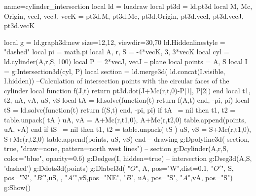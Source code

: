 \documentclass[border=5pt]{standalone}%
\begin{document}
\begin{luadraw}{name=cylinder_intersection}
local ld = luadraw
local pt3d = ld.pt3d
local M, Mc, Origin, vecI, vecJ, vecK = pt3d.M, pt3d.Mc, pt3d.Origin, pt3d.vecI, pt3d.vecJ, pt3d.vecK

local g = ld.graph3d:new{ size={12,12}, viewdir={30,70} }
ld.Hiddenlinestyle = "dashed"
local pi = math.pi
local A, r, S = -4*vecK, 3, 3*vecK
local cyl = ld.cylinder(A,r,S, 100)
local P = {2*vecJ, vecJ} -- plane
local points = {A, S}
local I = g:Intersection3d(cyl, P)
local section = ld.merge3d( ld.concat(I.visible, I.hidden))
--Calculation of intersection points with the circular faces of the cylinder
local function f(J,t)
    return pt3d.dot(J+Mc(r,t,0)-P[1], P[2])
end
local t1, t2, uA, vA, uS, vS
local tA = ld.solve(function(t) return f(A,t) end, -pi, pi)
local tS = ld.solve(function(t) return f(S,t) end, -pi, pi)
if tA ~= nil then
        t1, t2 = table.unpack( tA )
        uA, vA = A+Mc(r,t1,0), A+Mc(r,t2,0)
        table.append(points, {uA, vA})
end
if tS ~= nil then
    t1, t2 = table.unpack( tS )
    uS, vS = S+Mc(r,t1,0), S+Mc(r,t2,0)
    table.append(points, {uS, vS})
end 
-- drawing   
g:Dpolyline3d( section, true, "draw=none, pattern=north west lines") -- section
g:Dcylinder(A,r,S, {color="blue", opacity=0.6})
g:Dedges(I, {hidden=true}) -- intersection
g:Dseg3d({A,S}, 'dashed')
g:Ddots3d(points)
g:Dlabel3d( "$O$", A, {pos="W",dist=0.1}, "$O'$", S, {pos="N"}, "$B'$",uS, {}, "$A'$",vS,{pos="NE"},
    "$B$", uA, {pos="S"}, "$A$",vA, {pos="S"})
g:Show()
\end{luadraw}
\end{document}
